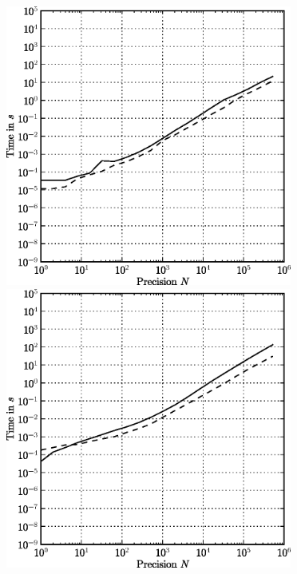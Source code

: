 \begin{figure}[ht]
\begin{minipage}[t]{0.5\linewidth}
\centering
\includegraphics[width=0.84\textwidth]{bin/qq-mul}
\end{minipage}
\begin{minipage}[t]{0.5\linewidth}
\centering
\includegraphics[width=0.84\textwidth]{bin/qq-inv}
\end{minipage}\\


\end{figure}
